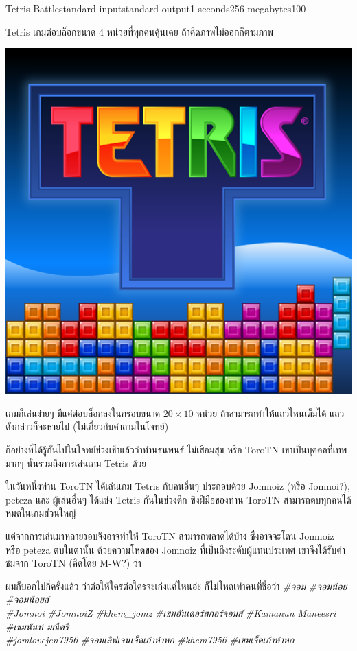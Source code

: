 \documentclass[11pt,a4paper]{article}
\begin{document}
\begin{problem}{Tetris Battle}{standard input}{standard output}{1 seconds}{256 megabytes}{100}

Tetris เกมต่อบล็อกขนาด $4$ หน่วยที่ทุกคนคุ้นเคย ถ้าคิดภาพไม่ออกก็ตามภาพ

\begin{center}
    \includegraphics[scale=0.25]{10-tetris battle/tetris.png}
\end{center}

เกมก็เล่นง่ายๆ มีแค่ต่อบล็อกลงในกรอบขนาด $20 \times 10$ หน่วย ถ้าสามารถทำให้แถวไหนเต็มได้ แถวดังกล่าวก็จะหายไป (ไม่เกี่ยวกับคำถามในโจทย์)

ก็อย่างที่ได้รู้กันไปในโจทย์ช่วงเช้าแล้วว่าท่านธนพนธ์ ไม่เสื่อมสุข หรือ ToroTN เขาเป็นบุคคลที่เทพมากๆ นั่นรวมถึงการเล่นเกม Tetris ด้วย

ในวันหนึ่งท่าน ToroTN ได้เล่นเกม Tetris กับคนอื่นๆ ประกอบด้วย Jomnoiz (หรือ Jomnoi?), peteza และ ผู้เล่นอื่นๆ ได้แข่ง Tetris กันในช่วงดึก ซึ่งฝีมือของท่าน ToroTN สามารถตบทุกคนได้หมดในเกมส่วนใหญ่ 

แต่จากการเล่นมาหลายรอบจึงอาจทำให้ ToroTN สามารถพลาดได้บ้าง ซึ่งอาจจะโดน Jomnoiz หรือ peteza ตบในตานั้น ด้วยความโหดของ Jomnoiz ที่เป็นถึงระดับผู้แทนประเทศ เขาจึงได้รับคำชมจาก ToroTN (คิดโดย M-W?) ว่า

\begin{center}
    ผมก็บอกไปกี่ครั้งแล้ว ว่าต่อให้ใครต่อใครจะเก่งแค่ไหนอ่ะ ก็ไม่โหดเท่าคนที่ชื่อว่า \emph{\#จอม} \emph{\#จอมน้อย} \emph{\#จอมน้อยส์} \\
    \emph{\#Jomnoi} \emph{\#JomnoiZ} \emph{\#khem\_jomz} \emph{\#เขมอันเดอร์สกอร์จอมส์}  \emph{\#Kamanun Maneesri} \emph{\#เขมนันท์ มณีศรี} \\
    \emph{\#jomlovejen7956} \emph{\#จอมเลิฟเจนเจ็ดเก้าห้าหก} \emph{\#khem7956} \emph{\#เขมเจ็ดเก้าห้าหก}
\end{center}


\end{problem}
\end{document}
